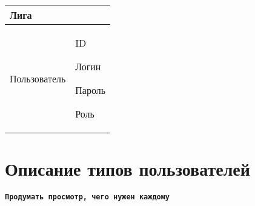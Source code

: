 \begin{table}[h!]
\begin{center}
\begin{threeparttable}
\begin{tabular}{|p{4cm}|p{12cm}|}
                    Лига\\
            \hline
            Пользователь & ID\par
                           Логин\par
                           Пароль\par
                           Роль\\
           \hline
        \end{tabular}
    \end{threeparttable}
    \end{center}
\end{table} 

\clearpage
\section{Описание типов пользователей}

\textbf{\texttt{Продумать просмотр, чего нужен каждому}}


